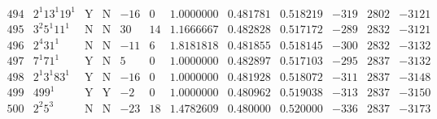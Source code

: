 \documentclass[11pt,reqno,a4letter]{article}
\numberwithin{figure}{section}
\numberwithin{table}{section}
\theoremstyle{plain}
\numberwithin{theorem}{section}
\theoremstyle{definition}
\newcommand{\NBRef}[1]{}
\begin{document}
\begin{table}[h!]
\begin{equation*}
{\begin{array}{cc|cc|ccc|cc|ccc}
 494 & 2^1 13^1 19^1 & \text{Y} & \text{N} & -16 & 0 & 1.0000000 & 0.481781 & 0.518219 & -319 & 2802 & -3121 \\
 495 & 3^2 5^1 11^1 & \text{N} & \text{N} & 30 & 14 & 1.1666667 & 0.482828 & 0.517172 & -289 & 2832 & -3121 \\
 496 & 2^4 31^1 & \text{N} & \text{N} & -11 & 6 & 1.8181818 & 0.481855 & 0.518145 & -300 & 2832 & -3132 \\
 497 & 7^1 71^1 & \text{Y} & \text{N} & 5 & 0 & 1.0000000 & 0.482897 & 0.517103 & -295 & 2837 & -3132 \\
 498 & 2^1 3^1 83^1 & \text{Y} & \text{N} & -16 & 0 & 1.0000000 & 0.481928 & 0.518072 & -311 & 2837 & -3148 \\
 499 & 499^1 & \text{Y} & \text{Y} & -2 & 0 & 1.0000000 & 0.480962 & 0.519038 & -313 & 2837 & -3150 \\
 500 & 2^2 5^3 & \text{N} & \text{N} & -23 & 18 & 1.4782609 & 0.480000 & 0.520000 & -336 & 2837 & -3173 \\  
\end{array}
}
\end{equation*}

\end{table} 


\newpage
\setcounter{section}{0}
\renewcommand{\thesection}{Appendix \Alph{section}}
\renewcommand{\thesubsection}{\Alph{section}.\arabic{subsection}}
\end{document}
